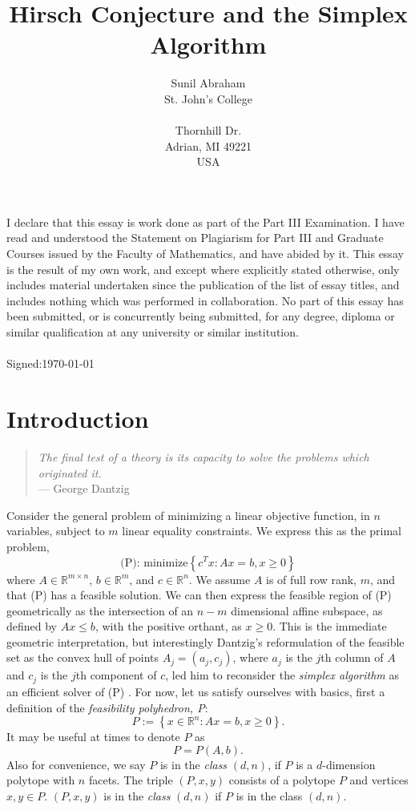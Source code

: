 \documentclass[11pt,a4paper]{article}
\theoremstyle{definition}
\begin{document}
\title{\sc Hirsch Conjecture and the Simplex Algorithm}
\author{\sc Sunil Abraham\\
\sc St. John's College\\
\\
 Thornhill Dr.\\
\sc Adrian, MI 49221\\
\sc USA}
\date{}
\maketitle


I declare that this essay is work done as part of the Part III Examination. I have
read and understood the Statement on Plagiarism for Part III and Graduate Courses
issued by the Faculty of Mathematics, and have abided by it. This essay is the result
of my own work, and except where explicitly stated otherwise, only includes material
undertaken since the publication of the list of essay titles, and includes nothing
which was performed in collaboration. No part of this essay has been submitted, or
is concurrently being submitted, for any degree, diploma or similar qualification at
any university or similar institution.
\\
\\
Signed:\dotfill\today
\newpage
\tableofcontents
\newpage
\section{Introduction}
\begin{quote}
\emph{The final test of a theory is its capacity to solve the problems which originated it.}\\
--- George Dantzig
\end{quote}

Consider the general problem of minimizing a linear objective function, in $n$ variables, subject to $m$  linear equality constraints. We express this as the primal problem,
$$\text{(P): minimize}\left\{ c^T x : Ax= b, x\ge 0\right\}$$
where $A\in\mathbb{R}^{m\times n}$, $b\in\mathbb{R}^m$, and $c\in\mathbb{R}^n$. We assume $A$ is of full row rank, $m$, and that (P) has a feasible solution. We can then express the feasible region of (P) geometrically as the intersection of an $n-m$ dimensional affine subspace, as defined by $Ax\le b$, with the positive orthant, as $x\ge 0$. This is the immediate geometric interpretation, but interestingly Dantzig's reformulation of the feasible set as the convex hull of points $A_j=(a_j,c_j)$, where $a_j$ is the $j$th column of $A$ and $c_j$ is the $j$th component of $c$, led him to reconsider the \emph{simplex algorithm} as an efficient solver of (P) \citep[Chapter 7]{dant63}. For now, let us satisfy ourselves with basics, first a definition of the \emph{feasibility polyhedron, P}:
$$P:=\left\{x\in\mathbb{R}^n : Ax=b, x\ge0\right\}.$$
It may be useful at times to denote $P$ as
$$P=P(A,b).$$
Also for convenience, we say $P$ is in the \emph{class} $(d,n)$, if $P$ is a $d$-dimension polytope with $n$ facets. The triple $(P,x,y)$ consists of a polytope $P$ and vertices $x,y\in P$. $(P,x,y)$ is in the \emph{class} $(d,n)$ if $P$ is in the class $(d,n)$. 
\end{document}
